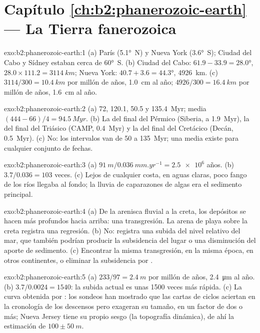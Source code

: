 \section*{Capítulo \ref{ch:b2:phanerozoic-earth} --- La Tierra fanerozoica}

\begin{solution}{exo:b2:phanerozoic-earth:1}
(a) París (\ang{5.1}~N) y Nueva York (\ang{3.6}~S); Ciudad del Cabo y Sídney estaban cerca de \ang{60}~S.
(b) Ciudad del Cabo: $61.9 - 33.9 = \ang{28.0}$, $28.0 \times 111.2 = \qty{3114}{km}$; Nueva York:
$40.7 + 3.6 = \ang{44.3}$, \qty{4926}{km}. (c) $3114/300 = \qty{10.4}{km}$ por millón de años,
\qty{1.0}{cm} al año; $4926/300 = \qty{16.4}{km}$ por millón de años, \qty{1.6}{cm} al año.
\end{solution}

\begin{solution}{exo:b2:phanerozoic-earth:2}
(a) 72, 120.1, 50.5 y \qty{135.4}{Myr}; media $(444 - 66)/4 = \qty{94.5}{Myr}$. (b) La
del final del Pérmico (Siberia, a \qty{1.9}{Myr}), la del final del Triásico (CAMP, \qty{0.4}{Myr}) y la del
final del Cretácico (Decán, \qty{0.5}{Myr}). (c) No: los intervalos van de 50 a
\qty{135}{Myr}; una media existe para cualquier conjunto de fechas.
\end{solution}

\begin{solution}{exo:b2:phanerozoic-earth:3}
(a) $\qty{91}{m}/\qty{0.036}{mm.yr^{-1}} = \num{2.5e6}$ años. (b) $3.7/0.036 = 103$ veces. (c)
Lejos de cualquier costa, en aguas claras, poco fango de los ríos llegaba al fondo; la lluvia de
caparazones de algas era el sedimento principal.
\end{solution}

\begin{solution}{exo:b2:phanerozoic-earth:4}
(a) De la arenisca fluvial a la creta, los depósitos se hacen más profundos hacia arriba: una transgresión. La
arena de playa sobre la creta registra una regresión. (b) No: registra una subida del nivel relativo del mar,
que también podrían producir la subsidencia del lugar o una disminución del aporte de sedimento. (c)
Encontrar la misma transgresión, en la misma época, en otros continentes, o eliminar la
subsidencia por .
\end{solution}

\begin{solution}{exo:b2:phanerozoic-earth:5}
(a) $233/97 = \qty{2.4}{m}$ por millón de años, \qty{2.4}{\micro m} al año. (b) $3.7/0.0024 =
1540$: la subida actual es unas 1500 veces más rápida. (c) La curva obtenida por : los sondeos han mostrado
que las cartas de ciclos aciertan en la cronología de los descensos pero exageran su tamaño, en un factor de dos o
más; Nueva Jersey tiene su propio sesgo (la topografía dinámica), de ahí la estimación de $100 \pm
\qty{50}{m}$.
\end{solution}

